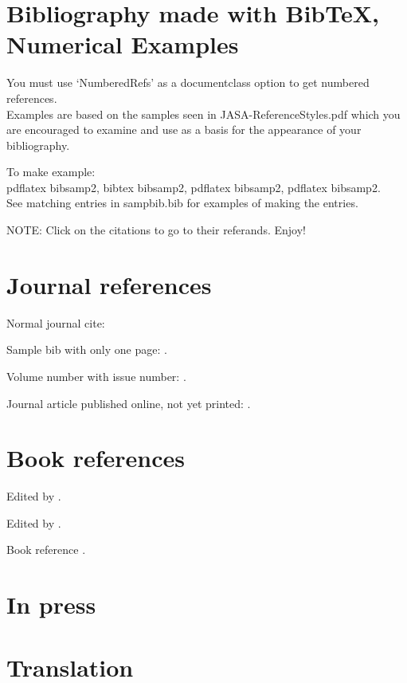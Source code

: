 \documentclass[preprint, NumberedRefs]{JASA}
\begin{document}
\section*{Bibliography made with BibTeX, Numerical Examples}

You must use `NumberedRefs' as a documentclass option to get
numbered references.\\
Examples are based on the samples seen in JASA-ReferenceStyles.pdf which you
are encouraged to examine and use as a basis for the appearance of your bibliography.

To make example:\\
 pdflatex bibsamp2, bibtex bibsamp2, pdflatex bibsamp2, pdflatex
 bibsamp2.\\
 See matching entries in sampbib.bib for examples of making the entries.

NOTE: Click on the citations to go to their referands. Enjoy!

\section*{Journal references}

 Normal journal cite: \cite{joursamp1}

 Sample bib with only one page: \cite{joursamp2}.

 Volume number with issue number: \cite{yang}.

Journal article published online, not yet printed: \cite{samponline}.


\section*{Book references}

Edited by \cite{sampincollection3}.

Edited by \cite{sampincollection4}.

Book reference \cite{booksamp1}.


\section*{In press}

\cite{inpress1,inpressSmith}


\section*{Translation}

\cite{translation}
\end{document}
